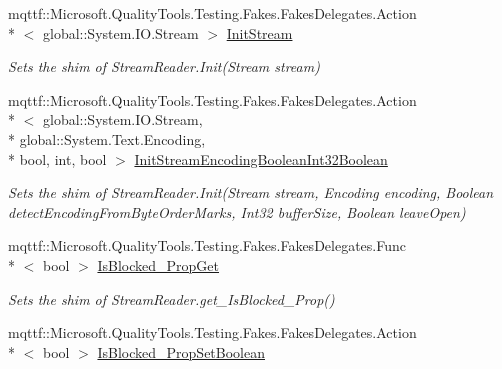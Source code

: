 \begin{DoxyCompactItemize}
mqttf\-::\-Microsoft.\-Quality\-Tools.\-Testing.\-Fakes.\-Fakes\-Delegates.\-Action\\*
$<$ global\-::\-System.\-I\-O.\-Stream $>$ \hyperlink{class_system_1_1_i_o_1_1_fakes_1_1_shim_stream_reader_a21ffd7bf965297d91080af0d119c0b4c}{Init\-Stream}
\begin{DoxyCompactList}\small\item\em Sets the shim of Stream\-Reader.\-Init(\-Stream stream)\end{DoxyCompactList}\item 
mqttf\-::\-Microsoft.\-Quality\-Tools.\-Testing.\-Fakes.\-Fakes\-Delegates.\-Action\\*
$<$ global\-::\-System.\-I\-O.\-Stream, \\*
global\-::\-System.\-Text.\-Encoding, \\*
bool, int, bool $>$ \hyperlink{class_system_1_1_i_o_1_1_fakes_1_1_shim_stream_reader_a3462592ccfa539086973de1ea6dfb1bb}{Init\-Stream\-Encoding\-Boolean\-Int32\-Boolean}
\begin{DoxyCompactList}\small\item\em Sets the shim of Stream\-Reader.\-Init(\-Stream stream, Encoding encoding, Boolean detect\-Encoding\-From\-Byte\-Order\-Marks, Int32 buffer\-Size, Boolean leave\-Open)\end{DoxyCompactList}\item 
mqttf\-::\-Microsoft.\-Quality\-Tools.\-Testing.\-Fakes.\-Fakes\-Delegates.\-Func\\*
$<$ bool $>$ \hyperlink{class_system_1_1_i_o_1_1_fakes_1_1_shim_stream_reader_aab103fdb005cc6b2e53c0ea18dc590c5}{Is\-Blocked\-\_\-\-Prop\-Get}
\begin{DoxyCompactList}\small\item\em Sets the shim of Stream\-Reader.\-get\-\_\-\-Is\-Blocked\-\_\-\-Prop()\end{DoxyCompactList}\item 
mqttf\-::\-Microsoft.\-Quality\-Tools.\-Testing.\-Fakes.\-Fakes\-Delegates.\-Action\\*
$<$ bool $>$ \hyperlink{class_system_1_1_i_o_1_1_fakes_1_1_shim_stream_reader_af3993cd08149f6975be4ff55a32d1a76}{Is\-Blocked\-\_\-\-Prop\-Set\-Boolean}

\end{DoxyCompactItemize}
